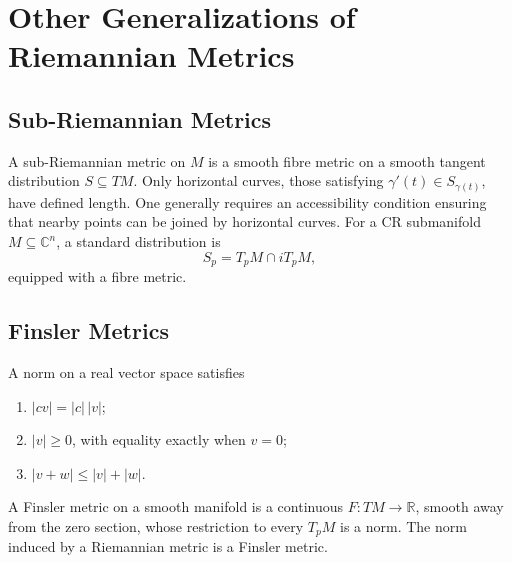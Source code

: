 \section{Other Generalizations of Riemannian Metrics}

\subsection{Sub-Riemannian Metrics}

A sub-Riemannian metric on $M$ is a smooth fibre metric on a smooth tangent distribution $S\subseteq TM$. Only horizontal curves, those satisfying $\gamma'(t)\in S_{\gamma(t)}$, have defined length. One generally requires an accessibility condition ensuring that nearby points can be joined by horizontal curves. For a CR submanifold $M\subseteq\mathbb C^n$, a standard distribution is
\[
S_p=T_pM\cap iT_pM,
\]
equipped with a fibre metric.

\subsection{Finsler Metrics}

A norm on a real vector space satisfies
\begin{enumerate}
\item $|cv|=|c|\,|v|$;
\item $|v|\ge0$, with equality exactly when $v=0$;
\item $|v+w|\le|v|+|w|$.
\end{enumerate}
A Finsler metric on a smooth manifold is a continuous $F:TM\to\mathbb R$, smooth away from the zero section, whose restriction to every $T_pM$ is a norm. The norm induced by a Riemannian metric is a Finsler metric.

